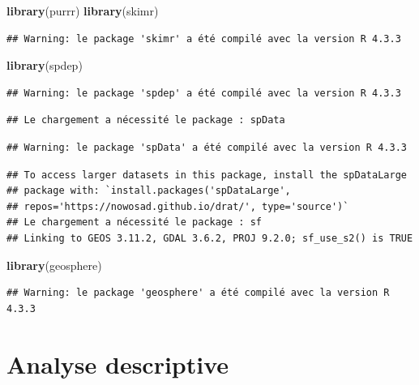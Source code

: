 \documentclass[
]{article}
\newenvironment{Shaded}{\begin{snugshade}}{\end{snugshade}}
\newcommand{\FunctionTok}[1]{\textcolor[rgb]{0.13,0.29,0.53}{\textbf{#1}}}
\newcommand{\NormalTok}[1]{#1}
\begin{document}
\begin{Shaded}
\begin{Highlighting}[]
\FunctionTok{library}\NormalTok{(purrr)}
\FunctionTok{library}\NormalTok{(skimr)}
\end{Highlighting}
\end{Shaded}

\begin{verbatim}
## Warning: le package 'skimr' a été compilé avec la version R 4.3.3
\end{verbatim}

\begin{Shaded}
\begin{Highlighting}[]
\FunctionTok{library}\NormalTok{(spdep)}
\end{Highlighting}
\end{Shaded}

\begin{verbatim}
## Warning: le package 'spdep' a été compilé avec la version R 4.3.3
\end{verbatim}

\begin{verbatim}
## Le chargement a nécessité le package : spData
\end{verbatim}

\begin{verbatim}
## Warning: le package 'spData' a été compilé avec la version R 4.3.3
\end{verbatim}

\begin{verbatim}
## To access larger datasets in this package, install the spDataLarge
## package with: `install.packages('spDataLarge',
## repos='https://nowosad.github.io/drat/', type='source')`
## Le chargement a nécessité le package : sf
## Linking to GEOS 3.11.2, GDAL 3.6.2, PROJ 9.2.0; sf_use_s2() is TRUE
\end{verbatim}

\begin{Shaded}
\begin{Highlighting}[]
\FunctionTok{library}\NormalTok{(geosphere)}
\end{Highlighting}
\end{Shaded}

\begin{verbatim}
## Warning: le package 'geosphere' a été compilé avec la version R 4.3.3
\end{verbatim}

\hypertarget{analyse-descriptive}{%
\section{Analyse descriptive}\label{analyse-descriptive}}
\end{document}

